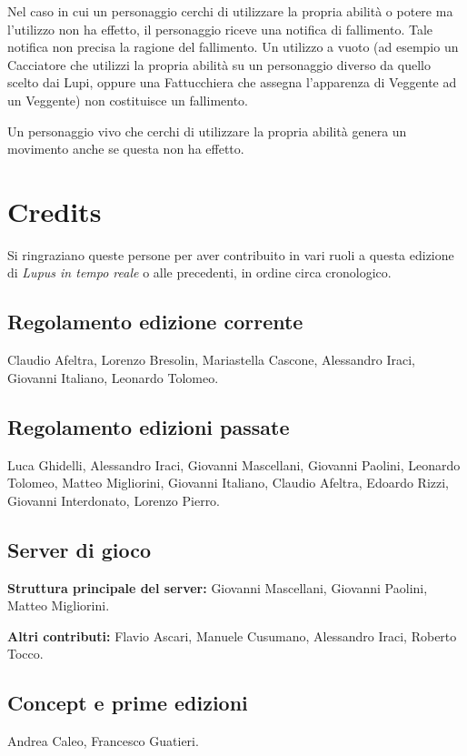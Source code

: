 \documentclass[a4paper,10pt]{article}
\begin{document}
Nel caso in cui un personaggio cerchi di utilizzare la propria abilità o potere ma l'utilizzo non ha effetto, il personaggio riceve una notifica di fallimento. Tale notifica non precisa la ragione del fallimento. Un utilizzo a vuoto (ad esempio un Cacciatore che utilizzi la propria abilità su un personaggio diverso da quello scelto dai Lupi, oppure una Fattucchiera che assegna l'apparenza di Veggente ad un Veggente) non costituisce un fallimento.

Un personaggio vivo che cerchi di utilizzare la propria abilità genera un movimento anche se questa non ha effetto.

\section{Credits}
\label{credits}

Si ringraziano queste persone per aver contribuito in vari ruoli a questa edizione di \emph{Lupus in tempo reale} o alle precedenti, in ordine circa cronologico.

\subsection*{Regolamento edizione corrente}

Claudio Afeltra, Lorenzo Bresolin, Mariastella Cascone, Alessandro Iraci, Giovanni Italiano, Leonardo Tolomeo.


\subsection*{Regolamento edizioni passate}

Luca Ghidelli, Alessandro Iraci, Giovanni Mascellani, Giovanni Paolini, Leonardo Tolomeo, Matteo Migliorini, Giovanni Italiano, Claudio Afeltra, Edoardo Rizzi, Giovanni Interdonato, Lorenzo Pierro.

\subsection*{Server di gioco}

\textbf{Struttura principale del server:} Giovanni Mascellani, Giovanni Paolini, Matteo Migliorini.

\textbf{Altri contributi:} Flavio Ascari, Manuele Cusumano, Alessandro Iraci, Roberto Tocco.

\subsection*{Concept e prime edizioni}

Andrea Caleo, Francesco Guatieri.
\end{document}
